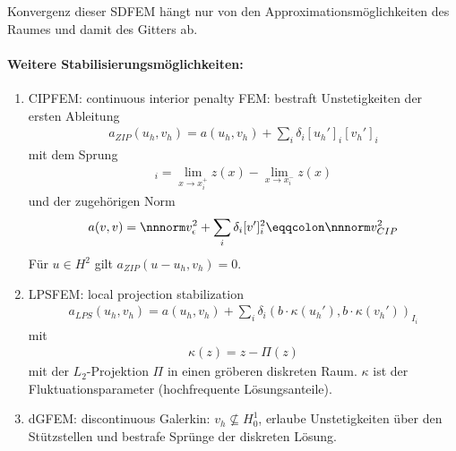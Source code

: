 Konvergenz dieser SDFEM hängt nur von den Approximationsmöglichkeiten des Raumes und damit des Gitters ab. 
\paragraph{Weitere Stabilisierungsmöglichkeiten:}
\label{sec:weit-stabili}
\begin{enumerate}
\item CIPFEM: continuous interior penalty FEM: bestraft Unstetigkeiten der ersten Ableitung
  \begin{align*}
   a_{ZIP}(u_{h}, v_{h}) =  a(u_{h}, v_{h}) + \sum_{i}\delta_{i}[u_{h}']_{i}[v_{h}']_{i}
  \end{align*}
  mit dem Sprung
  \begin{align*}
    [z]_{i} = \lim_{x \to x_{i}^{+}} z(x) - \lim_{x \to x_{i}^{-}} z(x)
  \end{align*}
und der zugehörigen Norm
\begin{align*}
  a(v, v) = \nnnorm v_{\epsilon}^{2} + \sum_{i} \delta_{i} [v']_{i}^{2} \eqqcolon \nnnorm v_{CIP}^{2}
\end{align*}
Für $u \in H^{2}$ gilt $a_{ZIP}(u-u_{h}, v_{h}) = 0$. 
\item LPSFEM: local projection stabilization
  \begin{align*}
    a_{LPS}(u_{h}, v_{h}) = a(u_{h}, v_{h}) + \sum_{i} \delta_{i}(b\cdot \kappa(u_{h}'), b\cdot \kappa(v_{h}'))_{I_{i}}
  \end{align*}
mit
\begin{align*}
  \kappa(z) = z - \Pi(z)
\end{align*}
mit der $L_{2}$-Projektion $\Pi$ in einen gröberen diskreten Raum. $\kappa$ ist der Fluktuationsparameter (hochfrequente Lösungsanteile). 
\item dGFEM: discontinuous Galerkin: $v_{h} \not \subseteq H_{0}^{1}$, erlaube Unstetigkeiten über den Stützstellen und bestrafe Sprünge der diskreten Lösung.
\end{enumerate}
